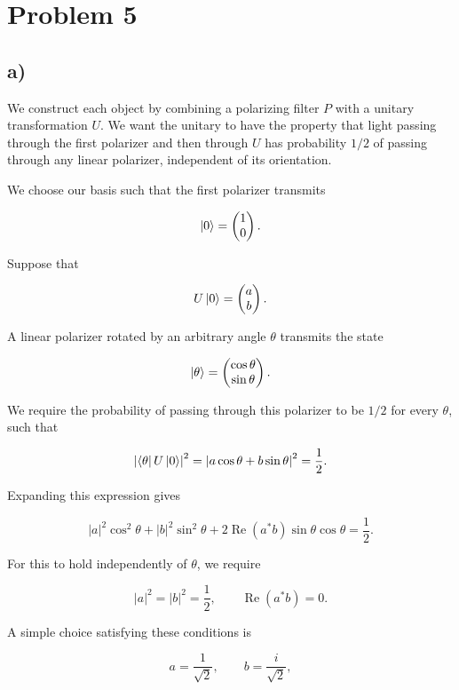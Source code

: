 \documentclass[11pt,a4paper]{article}
\begin{document}
\section*{Problem 5}
\subsection*{a)}
We construct each object by combining a polarizing filter $P$ with a unitary transformation $U$. We want the unitary to have the property that light passing through the first polarizer and then through $U$ has probability $1/2$ of passing through any linear polarizer, independent of its orientation.

We choose our basis such that the first polarizer transmits

$$
    \ket{0}
    =
    \begin{pmatrix}
        1\\
        0
    \end{pmatrix}.
$$

Suppose that

$$
    U\ket{0}
    =
    \begin{pmatrix}
        a\\
        b
    \end{pmatrix}.
$$

A linear polarizer rotated by an arbitrary angle $\theta$ transmits the state

$$
    \ket{\theta}
    =
    \begin{pmatrix}
        \cos\theta\\
        \sin\theta
    \end{pmatrix}.
$$

We require the probability of passing through this polarizer to be $1/2$ for every $\theta$, such that

$$
    \left|\bra{\theta}U\ket{0}\right|^2
    =
    \left|a\cos\theta+b\sin\theta\right|^2
    =
    \frac{1}{2}.
$$

Expanding this expression gives

$$
    |a|^2\cos^2\theta
    +
    |b|^2\sin^2\theta
    +
    2\operatorname{Re}(a^*b)\sin\theta\cos\theta
    =
    \frac{1}{2}.
$$

For this to hold independently of $\theta$, we require

$$
    |a|^2=|b|^2=\frac{1}{2},
    \qquad
    \operatorname{Re}(a^*b)=0.
$$

A simple choice satisfying these conditions is

$$
    a=\frac{1}{\sqrt{2}},
    \qquad
    b=\frac{i}{\sqrt{2}},
$$
\end{document}
